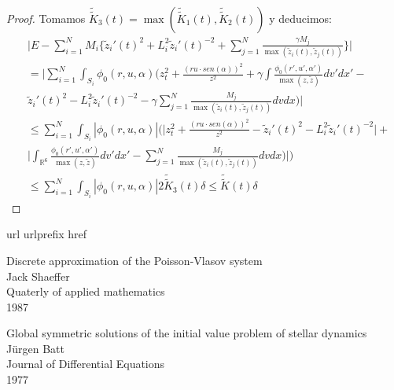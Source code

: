 \documentclass[a4paper,10pt]{scrartcl}
\theoremstyle{definition}
\newcommand{\dtilde}[1]{\widetilde{\widetilde{#1}}}
\numberwithin{equation}{section}
\begin{document}
\begin{proof}
Tomamos $\dtilde{K}_3(t) = \max(\dtilde{K}_1(t), \dtilde{K}_2(t))$ y deducimos:
\begin{align*}
&\Bigg|E - \sum_{i=1}^N M_i\bigg\{\widetilde{z}_i'(t)^2 + L_i^2\widetilde{z}_i'(t)^{-2} + \sum_{j=1}^N \frac{\gamma M_j}{\max(\widetilde{z}_i(t), \widetilde{z}_j(t))}\bigg\} \Bigg| \\
&= \Bigg|\sum_{i=1}^N \int_{S_i} \phi_0(r,u,\alpha) \Bigg(z_t^2 + \frac{(ru\cdot sen(\alpha))^2}{z^2} + \gamma \int \frac{\phi_0(r',u',\alpha')}{\max(z,\widetilde{z})} dv' dx' - \\
&\widetilde{z}_i'(t)^2 - L_i^2\widetilde{z}_i'(t)^{-2} - \gamma \sum_{j=1}^N \frac{M_j}{\max(\widetilde{z}_i(t), \widetilde{z}_j(t))} dv dx \Bigg)\Bigg| \\
&\le \sum_{i=1}^N \int_{S_i} |\phi_0(r,u,\alpha)| \Bigg(\Bigg| z_t^2 + \frac{(ru\cdot sen(\alpha))^2}{z^2} -
\widetilde{z}_i'(t)^2 - L_i^2\widetilde{z}_i'(t)^{-2} \Bigg| + \\
&\Bigg|\int_{\mathbb{R}^6} \frac{\phi_0(r',u',\alpha')}{\max(z,\widetilde{z})} dv' dx' - \sum_{j=1}^N \frac{M_j}{\max(\widetilde{z}_i(t), \widetilde{z}_j(t))} dv dx \Bigg)\Bigg|\Bigg) \\
&\le \sum_{i=1}^N \int_{S_i} |\phi_0(r,u,\alpha)| 2\dtilde{K}_3(t)\delta \le \dtilde{K}(t) \delta
\end{align*}


 \end{proof}


\newpage
\begin{thebibliography}{10}
    \expandafter\ifx\csname url\endcsname\relax
    \def\url#1{\texttt{#1}}\fi
    \expandafter\ifx\csname urlprefix\endcsname\relax\def\urlprefix{URL }\fi
    \expandafter\ifx\csname href\endcsname\relax
    \def\href#1#2{#2} \def\path#1{#1}\fi
    
    Discrete approximation of the Poisson-Vlasov system\\
    Jack Shaeffer\\
    Quaterly of applied mathematics\\
    1987
    
    Global symmetric solutions of the initial value problem of stellar dynamics\\
    Jürgen Batt\\
    Journal of Differential Equations\\
    1977
\end{thebibliography}
	
\end{document}
